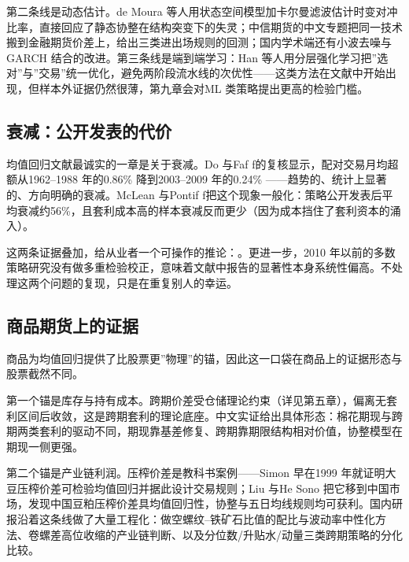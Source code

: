 \documentclass[12pt,a4paper]{ctexart}
\begin{document}
第二条线是动态估计。de Moura 等人用状态空间模型加卡尔曼滤波估计时变对冲比率\cite{33}，直接回应了静态协整在结构突变下的失灵；中信期货的中文专题把同一技术搬到金融期货价差上，给出三类进出场规则的回测\cite{47}；国内学术端还有小波去噪与GARCH 结合的改进\cite{44}。第三条线是端到端学习：Han 等人用分层强化学习把”\hspace{0.3em}选对”与”\hspace{0.3em}交易”\hspace{0.3em}统一优化\cite{34}，避免两阶段流水线的次优性——这类方法在文献中开始出现，但样本外证据仍然很薄，第九章会对ML 类策略提出更高的检验门槛。


\subsection{衰减：公开发表的代价}

均值回归文献最诚实的一章是关于衰减。Do 与Faf f的复核显示，配对交易月均超额从1962–1988 年的0.86\% 降到2003–2009 年的0.24\% \cite{35}——趋势的、统计上显著的、方向明确的衰减。McLean 与Pontif f把这个现象一般化：策略公开发表后平均衰减约56\%，且套利成本高的样本衰减反而更少（因为成本挡住了套利资本的涌入）\cite{36}。


这两条证据叠加，给从业者一个可操作的推论：。更进一步，2010 年以前的多数策略研究没有做多重检验校正\cite{45, 46}，意味着文献中报告的显著性本身系统性偏高。不处理这两个问题的复现，只是在重复别人的幸运。


\subsection{商品期货上的证据}

商品为均值回归提供了比股票更”\hspace{0.3em}物理”\hspace{0.3em}的锚，因此这一口袋在商品上的证据形态与股票截然不同。


第一个锚是库存与持有成本。跨期价差受仓储理论约束（详见第五章\cite{70, 71}），偏离无套利区间后收敛，这是跨期套利的理论底座。中文实证给出具体形态：棉花期现与跨期两类套利的驱动不同，期现靠基差修复、跨期靠期限结构相对价值，协整模型在期现一侧更强\cite{72}。


第二个锚是产业链利润。压榨价差是教科书案例——Simon 早在1999 年就证明大豆压榨价差可检验均值回归并据此设计交易规则\cite{40}；Liu 与He Sono 把它移到中国市场，发现中国豆粕压榨价差具均值回归性，协整与五日均线规则均可获利\cite{41}。国内研报沿着这条线做了大量工程化：做空螺纹–铁矿石比值的配比与波动率中性化方法\cite{68}、卷螺差高位收缩的产业链判断\cite{69}、以及分位数/升贴水/动量三类跨期策略的分化比较\cite{49}。
\end{document}
